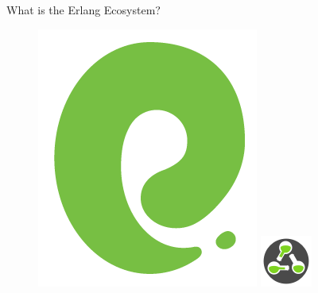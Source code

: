 \documentclass[
  ignorenonframetext,
  aspectratio=169]{beamer}
\begin{document}
\begin{frame}{What is the Erlang Ecosystem?}
\begin{figure}
\begin{minipage}{.24\textwidth}
  \centering
  \includegraphics[width=.8\linewidth]{./img/ecto_logo.png}
\end{minipage}
\begin{minipage}{.24\textwidth}
\centering
  \includegraphics[width=.8\linewidth]{./img/absinthe_logo.png}
\end{minipage}
\begin{minipage}{.24\textwidth}
\centering

\end{minipage}
\end{figure}
\end{frame}
\end{document}
